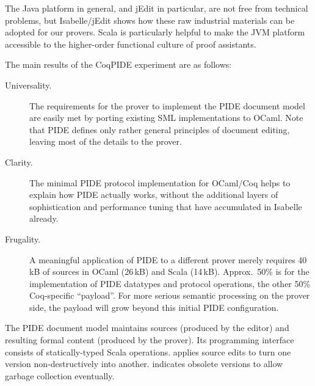 \begin{isabellebody}
\begin{isamarkuptext}
  The Java platform in general, and jEdit in particular, are not free
  from technical problems, but Isabelle/jEdit shows how these raw
  industrial materials can be adopted for our provers.  Scala is
  particularly helpful to make the JVM platform accessible to the
  higher-order functional culture of proof assistants.

  \smallskip The main results of the CoqPIDE experiment are as
  follows:
  \begin{description}

  \item[Universality.] The requirements for the prover to implement
  the PIDE document model are easily met by porting existing SML
  implementations to OCaml. Note that PIDE defines only rather general
  principles of document editing, leaving most of the details to the
  prover.

  \item[Clarity.] The minimal PIDE protocol implementation for
  OCaml/Coq helps to explain how PIDE actually works, without the
  additional layers of sophistication and performance tuning that have
  accumulated in Isabelle already.

  \item[Frugality.] A meaningful application of PIDE to a different
  prover merely requires 40\,kB of sources in OCaml (26\,kB) and Scala
  (14\,kB).  Approx.\ 50\% is for the implementation of PIDE datatypes
  and protocol operations, the other 50\% Coq-specific ``payload''.
  For more serious semantic processing on the prover side, the payload
  will grow beyond this initial PIDE configuration.

  \end{description}\end{isamarkuptext}\isamarkuptrue {}
\isamarkuptrue \begin{isamarkuptext}The PIDE document model maintains sources (produced by the
  editor) and resulting formal content (produced by the prover).  Its
  programming interface consists of statically-typed Scala operations.
   applies
  source edits to turn one version non-destructively into another.
   indicates obsolete
  versions to allow garbage collection eventually.
  

\end{isamarkuptext}
\end{isabellebody}
